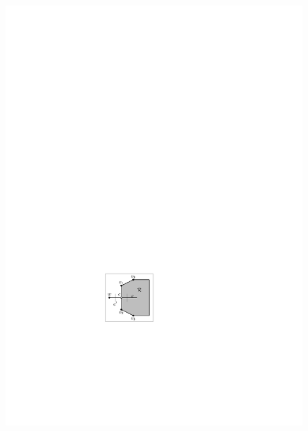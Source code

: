 \begin{figure}[htb]
\begin{minipage}[b]{.24\textwidth}
        \includegraphics[width=\textwidth,page=2]{images/3planar_polygon}
        \subcaption{~}\label{fig:3_planar_polygon_after}
    \end{minipage}
    \begin{minipage}[b]{.24\textwidth}
        \centering

\end{minipage}
\end{figure}
